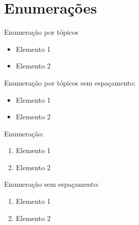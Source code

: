 \section{Enumerações}
Enumeração por tópicos
\begin{itemize}
    \item Elemento 1
    \item Elemento 2
\end{itemize}
Enumeração por tópicos sem espaçamento:
\begin{itemize}[noitemsep]
    \item Elemento 1
    \item Elemento 2
\end{itemize}
Enumeração:
\begin{enumerate}
    \item Elemento 1
    \item Elemento 2
\end{enumerate}
Enumeração sem espaçamento:
\begin{enumerate}[noitemsep]
    \item Elemento 1
    \item Elemento 2
\end{enumerate}
\newpage
\hfill\break